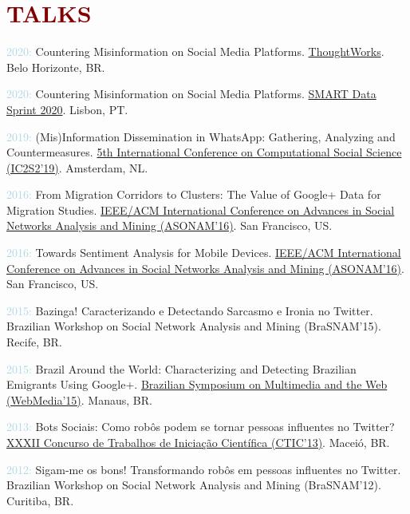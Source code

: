 
\section*{\textcolor{maroon}{\normalsize TALKS}} 

\begin{innerlist}[-]
    \item \textcolor{lightblue}{2020:} Countering Misinformation on Social Media Platforms. \href{https://www.thoughtworks.com/locations/brasil/}{ThoughtWorks}. Belo Horizonte, BR.
    \item \textcolor{lightblue}{2020:} Countering Misinformation on Social Media Platforms. \href{https://smart.inovamedialab.org/2020-digital-methods/theme/}{SMART Data Sprint 2020}. Lisbon, PT.
    \item \textcolor{lightblue}{2019:} (Mis)Information Dissemination in WhatsApp: Gathering, Analyzing and Countermeasures. \href{https://2019.ic2s2.org/oral-presentations/}{5th International Conference on Computational Social Science (IC2S2'19)}. Amsterdam, NL.
    \item \textcolor{lightblue}{2016:} From Migration Corridors to Clusters: The Value of Google+ Data for Migration Studies. \href{http://asonam.cpsc.ucalgary.ca/2016/}{IEEE/ACM International Conference on Advances in Social Networks Analysis and Mining (ASONAM'16)}. San Francisco, US.
    \item \textcolor{lightblue}{2016:} Towards Sentiment Analysis for Mobile Devices. \href{http://asonam.cpsc.ucalgary.ca/2016/}{IEEE/ACM International Conference on Advances in Social Networks Analysis and Mining (ASONAM'16)}. San Francisco, US.
    \item \textcolor{lightblue}{2015:} Bazinga! Caracterizando e Detectando Sarcasmo e Ironia no Twitter. Brazilian Workshop on Social Network Analysis and Mining (BraSNAM'15). Recife, BR.
    \item \textcolor{lightblue}{2015:} Brazil Around the World: Characterizing and Detecting Brazilian Emigrants Using Google+. \href{https://webmedia.org.br/2015/}{Brazilian Symposium on Multimedia and the Web (WebMedia'15)}. Manaus, BR.
    \item \textcolor{lightblue}{2013:} Bots Sociais: Como robôs podem se tornar pessoas influentes no Twitter? \href{http://www.ic.ufal.br/csbc2013/noticias/ctic}{XXXII Concurso de Trabalhos de Iniciação Científica (CTIC'13)}. Maceió, BR.
    \item \textcolor{lightblue}{2012:} Sigam-me os bons! Transformando robôs em pessoas influentes no Twitter. Brazilian Workshop on Social Network Analysis and Mining (BraSNAM'12). Curitiba, BR.

\end{innerlist}
